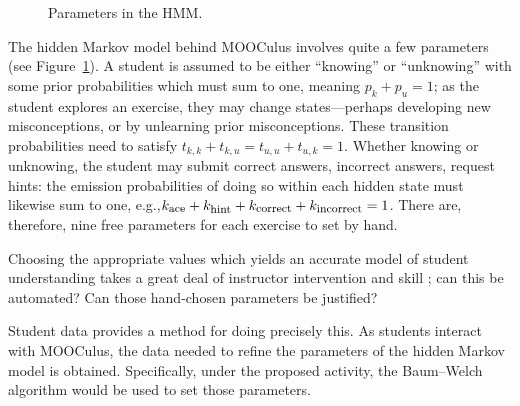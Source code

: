\documentclass[12pt]{article}
\begin{document}
\begin{figure}
\begin{center}
\end{center}
  \caption{Parameters in the HMM.}

  \label{fig:parameters}
\end{figure}

The hidden Markov model behind MOOCulus involves quite a few
parameters (see Figure~\ref{fig:parameters}).  A student is assumed to
be either ``knowing'' or ``unknowing'' with some prior probabilities
which must sum to one, meaning $p_k + p_u = 1$; as the student
explores an exercise, they may change states---perhaps developing new
misconceptions, or by unlearning prior misconceptions.  These
transition probabilities need to satisfy $t_{k,k} + t_{k,u} = t_{u,u}
+ t_{u,k} = 1$.  Whether knowing or unknowing, the student may submit
correct answers, incorrect answers, request hints: the emission
probabilities of doing so within each hidden state must likewise sum
to one, e.g.,$k_{\mbox{\footnotesize ace}} + k_{\mbox{\footnotesize
    hint}} + k_{\mbox{\footnotesize correct}} + k_{\mbox{\footnotesize
    incorrect}}=1$.  There are, therefore, nine free parameters for
each exercise to set by hand.

Choosing the appropriate values which yields an accurate model of
student understanding takes a great deal of instructor intervention
and skill \parencite{romero2010educational}; can this be automated?
Can those hand-chosen parameters be justified?

Student data provides a method for doing precisely this.  As students
interact with MOOCulus, the data needed to refine the parameters of
the hidden Markov model is obtained.  Specifically, under the proposed
activity, the Baum--Welch algorithm would be used to set those
parameters.
\end{document}

